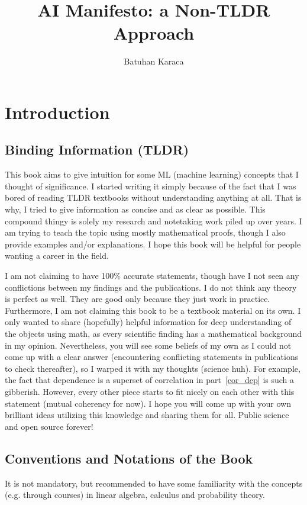 \documentclass{book}
\title{AI Manifesto: a Non-TLDR Approach}
\author{Batuhan Karaca}
\numberwithin{equation}{subsection}
\begin{document}
\maketitle
\tableofcontents
\chapter{Introduction}
\section{Binding Information (TLDR)}
This book aims to give intuition for some ML (machine learning) concepts that I thought of significance. I started writing it simply because of the fact that I was bored of reading TLDR textbooks without understanding anything at all. That is why, I tried to give information as concise and as clear as possible. This compound thingy is solely my research and notetaking work piled up over years. I am trying to teach the topic using mostly mathematical proofs, though I also provide examples and/or explanations. I hope this book will be helpful for people wanting a career in the field.

I am not claiming to have 100\% accurate statements, though have I not seen any conflictions between my findings and the publications. I do not think any theory is perfect as well. They are good only because they just work in practice. Furthermore, I am not claiming this book to be a textbook material on its own. I only wanted to share (hopefully) helpful information for deep understanding of the objects using math, as every scientific finding has a mathematical background in my opinion. Nevertheless, you will see some beliefs of my own as I could not come up with a clear answer (encountering conflicting statements in publications to check thereafter), so I warped it with my thoughts (science huh). For example, the fact that dependence is a superset of correlation in part~\ref{cor_dep} is such a gibberish. However, every other piece starts to fit nicely on each other with this statement (mutual coherency for now). I hope you will come up with your own brilliant ideas utilizing this knowledge and sharing them for all. Public science and open source forever!
\section{Conventions and Notations of the Book}
It is not mandatory, but recommended to have some familiarity with the concepts (e.g. through courses) in linear algebra, calculus and probability theory. 
\end{document}
